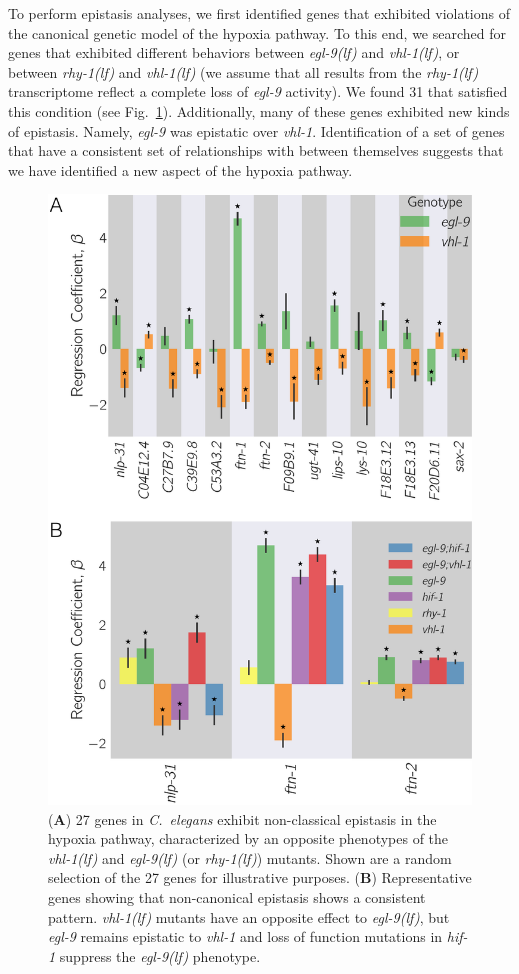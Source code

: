 \documentclass[9pt,twocolumn,twoside]{pnas-new}
\newcommand{\cel}{\emph{C.~elegans}}
\newcommand{\gene}[1]{\emph{#1}}
\newcommand{\egl}{\emph{egl-9(lf)}}
\newcommand{\rhy}{\emph{rhy-1(lf)}}
\newcommand{\vhl}{\emph{vhl-1(lf)}}
\newcommand{\hifohtargets}{31}
\begin{document}
To perform epistasis analyses, we first identified genes that exhibited violations
of the canonical genetic model of the hypoxia pathway. To this end, we searched for
genes that exhibited different behaviors between \egl{} and \vhl{}, or
between \rhy{} and \vhl{} (we assume that all results from the
\rhy{} transcriptome reflect a complete loss of \gene{egl-9} activity). We found
\hifohtargets{} that satisfied this condition (see Fig.~\ref{fig:hif1oh}).
Additionally, many of these genes exhibited new kinds of epistasis. Namely,
\gene{egl-9} was epistatic over \gene{vhl-1}. Identification of a set of genes
that have a consistent set of relationships with between themselves suggests that
we have identified a new aspect of the hypoxia pathway.

\begin{figure}[tbhp]
\centering
\includegraphics[width=\linewidth]{figs/hif1oh_epistasis.pdf}
\caption{
(\textbf{A}) 27 genes in \cel{} exhibit non-classical epistasis in the hypoxia
pathway, characterized by an opposite phenotypes of the \vhl{} and \egl{} (or
\rhy{}) mutants. Shown are a random selection of the 27 genes for illustrative
purposes.
(\textbf{B}) Representative genes showing that non-canonical epistasis shows a
consistent pattern. \vhl{} mutants have an opposite effect to \egl{}, but
\gene{egl-9} remains epistatic to \gene{vhl-1} and loss of function mutations in
\gene{hif-1} suppress the \egl{} phenotype.
}
\label{fig:hif1oh}
\end{figure}
\end{document}
